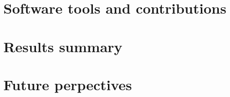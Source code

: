 \documentclass{article}
\begin{document}
\section{Software tools and contributions}


\section{Results summary}


\section{Future perpectives}

\newcommand{\urlprefix}[0]{}  %



\end{document}
